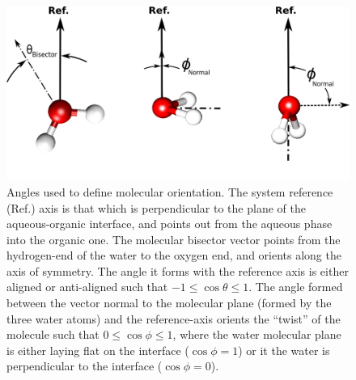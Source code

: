 \begin{figure}[h!]
\begin{center}
	\includegraphics[scale=1.0]{images/water-angles.png}
	\caption{Angles used to define molecular orientation. The system reference (Ref.) axis is that which is perpendicular to the plane of the aqueous-organic interface, and points out from the aqueous phase into the organic one. The molecular bisector vector points from the hydrogen-end of the water to the oxygen end, and orients along the axis of symmetry. The angle it forms with the reference axis is either aligned or anti-aligned such that $-1\le \cos\theta \le 1$. The angle formed between the vector normal to the molecular plane (formed by the three water atoms) and the reference-axis orients the ``twist'' of the molecule such that $0 \le \cos\phi \le 1$, where the water molecular plane is either laying flat on the interface ($\cos\phi=1$) or it the water is perpendicular to the interface ($\cos\phi=0$).}
	\label{fig:water-angles}
\end{center}
\end{figure}



